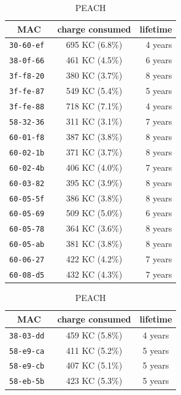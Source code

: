 \documentclass{elsarticle}
\begin{document}
\begin{table}
\begin{subtable}{.5\textwidth}
    \begin{tabular}{|c|c|r|}
        \toprule
        MAC           & charge consumed  &   lifetime \\
        \midrule
        \tt{30-60-ef} &  695 KC (6.8\%)  &  4 years \\
        \tt{38-0f-66} &  461 KC (4.5\%)  &  6 years \\
        \tt{3f-f8-20} &  380 KC (3.7\%)  &  8 years \\
        \tt{3f-fe-87} &  549 KC (5.4\%)  &  5 years \\
        \tt{3f-fe-88} &  718 KC (7.1\%)  &  4 years \\
        \tt{58-32-36} &  311 KC (3.1\%)  &  7 years \\
        \tt{60-01-f8} &  387 KC (3.8\%)  &  8 years \\
        \tt{60-02-1b} &  371 KC (3.7\%)  &  8 years \\
        \tt{60-02-4b} &  406 KC (4.0\%)  &  7 years \\
        \tt{60-03-82} &  395 KC (3.9\%)  &  8 years \\
        \tt{60-05-5f} &  386 KC (3.8\%)  &  8 years \\
        \tt{60-05-69} &  509 KC (5.0\%)  &  6 years \\
        \tt{60-05-78} &  364 KC (3.6\%)  &  8 years \\
        \tt{60-05-ab} &  381 KC (3.8\%)  &  8 years \\
        \tt{60-06-27} &  422 KC (4.2\%)  &  7 years \\
        \tt{60-08-d5} &  432 KC (4.3\%)  &  7 years \\
        \bottomrule
    \end{tabular}
    \caption{PEACH}
\end{subtable}\hfill
\begin{subtable}{.43\textwidth}
    \begin{tabular}{|c|c|c|}
        \toprule
        MAC           &  charge consumed & lifetime \\
        \midrule
        \tt{38-03-dd} &  459 KC (5.8\%)  &  4 years \\
        \tt{58-e9-ca} &  411 KC (5.2\%)  &  5 years \\
        \tt{58-e9-cb} &  407 KC (5.1\%)  &  5 years \\
        \tt{58-eb-5b} &  423 KC (5.3\%)  &  5 years \\

\end{tabular}
\end{subtable}
\end{table}
\end{document}
